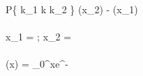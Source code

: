 \\ P\left \{
k_{1} \leqslant  k \leqslant k_{2}
\right \}
\approx \Phi(x_{2}) - \Phi(x_{1})
\\
\\ x_{1} = 
\; \; ; \; \;
x_{2} = 
\\
\\ \Phi(x) = \int_{0}^{x}e^{-}
